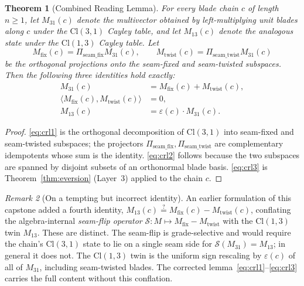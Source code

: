 \documentclass[11pt,a4paper]{article}
\theoremstyle{plain}
\newtheorem{theorem}{Theorem}[section]
\theoremstyle{definition}
\theoremstyle{remark}
\newtheorem{remark}[theorem]{Remark}
\numberwithin{equation}{section}
\providecommand{\Cl}{\mathrm{Cl}}
\providecommand{\eps}{\varepsilon}
\begin{document}
\begin{theorem}[Combined Reading Lemma]\label{thm:combined-reading}
For every blade chain $c$ of length $n \geq 1$, let $M_{31}(c)$
denote the multivector obtained by left-multiplying unit blades
along $c$ under the $\Cl(3,1)$ Cayley table, and let $M_{13}(c)$
denote the analogous state under the $\Cl(1,3)$ Cayley table.
Let
\[
  M_{\mathrm{fix}}(c)   = \Pi_{\mathrm{seam\_fix}}   M_{31}(c),
  \qquad
  M_{\mathrm{twist}}(c) = \Pi_{\mathrm{seam\_twist}} M_{31}(c)
\]
be the orthogonal projections onto the seam-fixed and seam-twisted
subspaces.  Then the following three identities hold exactly:
\begin{align}
  M_{31}(c)   &= M_{\mathrm{fix}}(c) + M_{\mathrm{twist}}(c),
   \tag{CRL-1}\label{eq:crl1}\\
  \langle M_{\mathrm{fix}}(c), M_{\mathrm{twist}}(c) \rangle
              &= 0,
   \tag{CRL-2}\label{eq:crl2}\\
  M_{13}(c)   &= \eps(c) \cdot M_{31}(c).
   \tag{CRL-3}\label{eq:crl3}
\end{align}
\end{theorem}

\begin{proof}
\eqref{eq:crl1} is the orthogonal decomposition of $\Cl(3,1)$ into
seam-fixed and seam-twisted subspaces; the projectors
$\Pi_{\mathrm{seam\_fix}}, \Pi_{\mathrm{seam\_twist}}$ are
complementary idempotents whose sum is the identity.
\eqref{eq:crl2} follows because the two subspaces are spanned by
disjoint subsets of an orthonormal blade basis.
\eqref{eq:crl3} is Theorem~\ref{thm:eversion} (Layer~3) applied to
the chain $c$.
\end{proof}

\begin{remark}[On a tempting but incorrect identity]
\label{rem:crl-correction}
An earlier formulation of this capstone added a fourth identity,
$M_{13}(c) \stackrel{?}{=} M_{\mathrm{fix}}(c) -
M_{\mathrm{twist}}(c)$, conflating the algebra-internal
\emph{seam-flip operator}
$\mathcal{S}: M \mapsto M_{\mathrm{fix}} - M_{\mathrm{twist}}$
with the $\Cl(1,3)$ twin $M_{13}$.  These are distinct.  The
seam-flip is grade-selective and would require the chain's
$\Cl(3,1)$ state to lie on a single seam side for
$\mathcal{S}(M_{31}) = M_{13}$; in general it does not.  The
$\Cl(1,3)$ twin is the uniform sign rescaling by $\eps(c)$ of all
of $M_{31}$, including seam-twisted blades.  The corrected
lemma~\eqref{eq:crl1}--\eqref{eq:crl3} carries the full content
without this conflation.
\end{remark}
\end{document}

